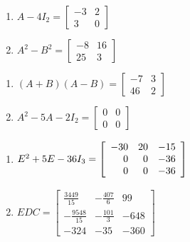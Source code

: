 \begin{multicols}{2} 
\begin{enumerate}
\setcounter{enumi}{\value{HW}}

\item  $A - 4I_{2} = \left[ \begin{array}{rr} -3 & 2 \\ 3 & 0 \end{array} \right]$

\item  $A^2 - B^2 = \left[ \begin{array}{rr} -8 & 16 \\ 25 & 3 \end{array} \right]$


\setcounter{HW}{\value{enumi}}
\end{enumerate}
\end{multicols}

\begin{multicols}{2} 
\begin{enumerate}
\setcounter{enumi}{\value{HW}}

\item  $(A+B)(A-B) = \left[ \begin{array}{rr} -7 & 3 \\ 46 & 2 \end{array} \right]$

\item  $A^2-5A-2I_{2} = \left[ \begin{array}{rr} 0 & 0 \\ 0 & 0 \end{array} \right]$


\setcounter{HW}{\value{enumi}}
\end{enumerate}
\end{multicols}

\begin{multicols}{2} 
\begin{enumerate}
\setcounter{enumi}{\value{HW}}

\item  $E^2 + 5E-36I_{3} = \left[ \begin{array}{rrr} -30 & 20 & -15 \\ 0 & 0 & -36 \\ 0 & 0 & -36 \end{array} \right] \vphantom{\left[ \begin{array}{rrr} \frac{3449}{15} & -\frac{407}{6} & 99 \\[3pt] -\frac{9548}{15} & -\frac{101}{3} & -648 \\ -324 & -35 & -360 \end{array} \right]}$

\item $EDC = \left[ \begin{array}{rrr} \frac{3449}{15} & -\frac{407}{6} & 99 \\[3pt] -\frac{9548}{15} & -\frac{101}{3} & -648 \\ -324 & -35 & -360 \end{array} \right]$


\setcounter{HW}{\value{enumi}}
\end{enumerate}
\end{multicols}


